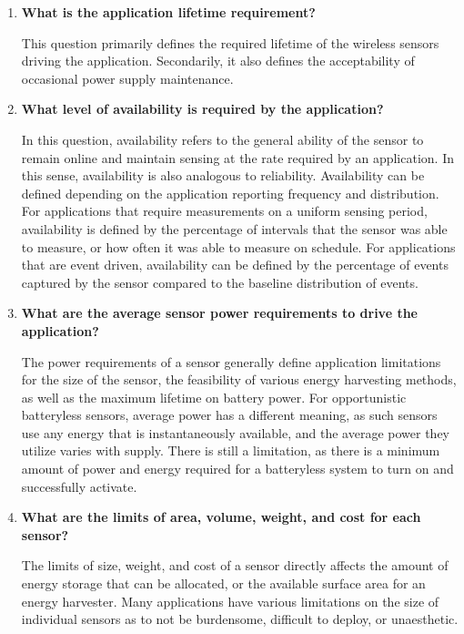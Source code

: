 \begin{enumerate}
    \item \textbf{What is the application lifetime requirement?}

    This question primarily defines the required lifetime of the wireless sensors driving the application. Secondarily, it also defines the acceptability of occasional power supply maintenance.

    \item \textbf{What level of availability is required by the application?}

    In this question, availability refers to the general ability of the sensor to remain online and maintain sensing at the rate required by an application. In this sense, availability is also analogous to reliability.
    Availability can be defined depending on the application reporting frequency and distribution. For applications that require measurements on a uniform sensing period, availability is defined by the percentage of intervals that the sensor was able to measure, or how often it was able to measure on schedule. For applications that are event driven, availability can be defined by the percentage of events captured by the sensor compared to the baseline distribution of events.

    \item \textbf{What are the average sensor power requirements to drive the application?}

    The power requirements of a sensor generally define application limitations for the size of the sensor, the feasibility of various energy harvesting methods, as well as the maximum lifetime on battery power.
    For opportunistic batteryless sensors, average power has a different meaning, as such sensors use any energy that is instantaneously available, and the average power they utilize varies with supply.
    There is still a limitation, as there is a minimum amount of power and energy required for a batteryless system to turn on and successfully activate.

    \item \textbf{What are the limits of area, volume, weight, and cost for each sensor?}

    The limits of size, weight, and cost of a sensor directly affects the amount of energy storage that can be allocated, or the available surface area for an energy harvester. Many applications have various limitations on the size of individual sensors as to not be burdensome, difficult to deploy, or unaesthetic.

%
%
\end{enumerate}


